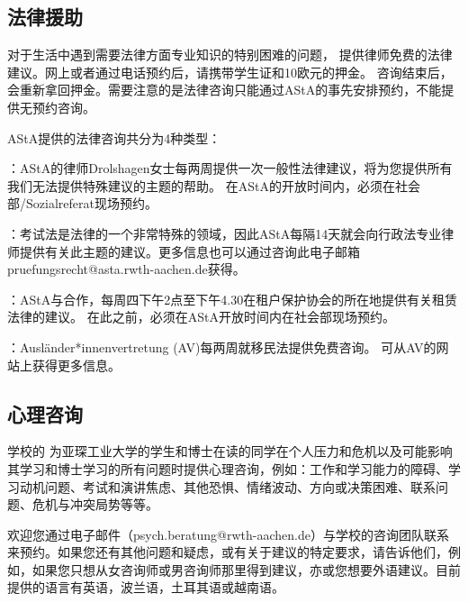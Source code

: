   \subsection{法律援助}\label{subsec:法律援助}

    对于生活中遇到需要法律方面专业知识的特别困难的问题，\href{https://www.asta.rwth-aachen.de/beratung/rechtsberatung/}{} 提供律师免费的法律建议。网上或者通过电话预约后，请携带学生证和10欧元的押金。 咨询结束后，会重新拿回押金。需要注意的是法律咨询只能通过AStA的事先安排预约，不能提供无预约咨询。

    AStA提供的法律咨询共分为4种类型：

    ：AStA的律师Drolshagen女士每两周提供一次一般性法律建议，将为您提供所有我们无法提供特殊建议的主题的帮助。 在AStA的开放时间内，必须在社会部/Sozialreferat现场预约。

    ：考试法是法律的一个非常特殊的领域，因此AStA每隔14天就会向行政法专业律师提供有关此主题的建议。更多信息也可以通过咨询此电子邮箱pruefungsrecht@asta.rwth-aachen.de获得。

    ：AStA与\href{https://mieterverein-aachen.de/}{}合作，每周四下午2点至下午4.30在租户保护协会的所在地提供有关租赁法律的建议。 在此之前，必须在AStA开放时间内在社会部现场预约。

    ：Ausländer*innenvertretung (AV)每两周就移民法提供免费咨询。 可从AV的网站上获得更多信息。

  \subsection{心理咨询}\label{subsec:心理咨询}

    学校的\href{https://www.rwth-aachen.de/cms/root/Studium/Beratung-Hilfe/~sei/Psychologische-Beratung/}{} 为亚琛工业大学的学生和博士在读的同学在个人压力和危机以及可能影响其学习和博士学习的所有问题时提供心理咨询，例如：工作和学习能力的障碍、学习动机问题、考试和演讲焦虑、其他恐惧、情绪波动、方向或决策困难、联系问题、危机与冲突局势等等。

    欢迎您通过电子邮件（psych.beratung@rwth-aachen.de）与学校的咨询团队联系来预约。如果您还有其他问题和疑虑，或有关于建议的特定要求，请告诉他们，例如，如果您只想从女咨询师或男咨询师那里得到建议，亦或您想要外语建议。目前提供的语言有英语，波兰语，土耳其语或越南语。

